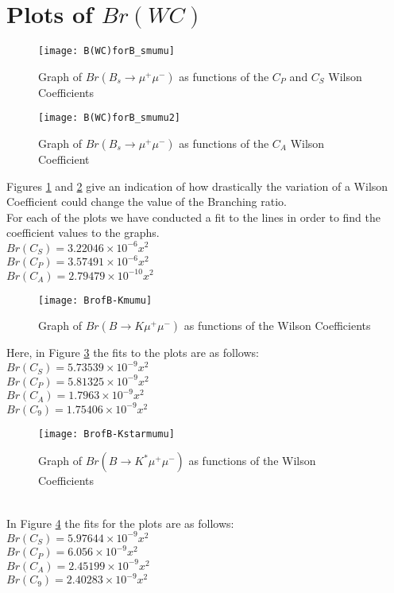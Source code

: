\documentclass[12pt]{article}
\begin{document}
\section{Plots of $Br(WC)$}
\begin{figure}[h]
\centering
\texttt{[image: B(WC)forB\_smumu]}
\caption{Graph of $Br(B_s\rightarrow \mu^+\mu^-)$ as functions of the $C_P$ and $C_S$ Wilson Coefficients}
\label{fig:Bsmumu1}
\end{figure}
\begin{figure}[h]
\centering
\texttt{[image: B(WC)forB\_smumu2]}
\caption{Graph of $Br(B_s\rightarrow \mu^+\mu^-)$ as functions of the $C_A$ Wilson Coefficient}
\label{fig:Bsmumu2}
\end{figure}
Figures \ref{fig:Bsmumu1} and \ref{fig:Bsmumu2} give an indication of how drastically the variation of a Wilson Coefficient could change the value of the Branching ratio.\\
For each of the plots we have conducted a fit to the lines in order to find the coefficient values to the graphs. \\
$Br(C_S)=3.22046\times10^{-6} x^2$\\
$Br(C_P)=3.57491\times10^{-6} x^2$\\
$Br(C_A)=2.79479\times10^{-10} x^2$\\
\begin{figure}[h]
\centering
\texttt{[image: BrofB-Kmumu]}
\caption{Graph of $Br(B\rightarrow K\mu^+\mu^-)$ as functions of the Wilson Coefficients}
\label{fig:Bkmumu}
\end{figure}
Here, in Figure \ref{fig:Bkmumu} the fits to the plots are as follows:\\
$Br(C_S)=5.73539\times10^{-9} x^2$\\
$Br(C_P)=5.81325\times10^{-9} x^2$\\
$Br(C_A)=1.7963\times10^{-9} x^2$\\
$Br(C_9)=1.75406\times10^{-9} x^2$\\
\begin{figure}[h]
\centering
\texttt{[image: BrofB-Kstarmumu]}
\caption{Graph of $Br(B\rightarrow K^*\mu^+\mu^-)$ as functions of the Wilson Coefficients}
\label{fig:bKstarmumu}
\end{figure}\\
In Figure \ref{fig:bKstarmumu} the fits for the plots are as follows:\\
$Br(C_S)=5.97644\times10^{-9}x^2$\\
$Br(C_P)=6.056\times10^{-9}x^2$\\
$Br(C_A)=2.45199\times10^{-9} x^2$\\
$Br(C_9)=2.40283\times10^{-9} x^2$\\
\end{document}
